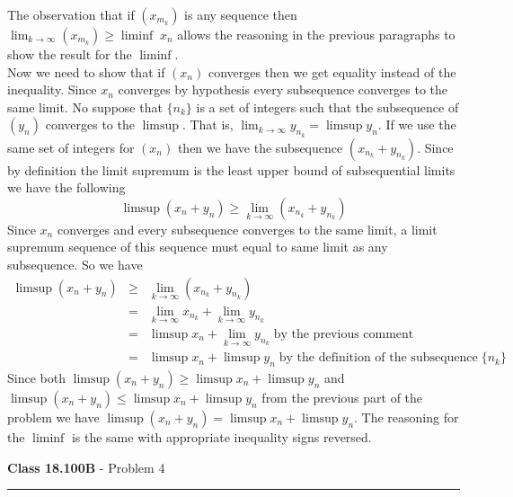 \documentclass[11pt,reqno]{article}
\begin{document}
The observation that if $(x_{m_k})$ is any sequence then $\lim_{k \to \infty}(x_{m_k}) \ge \liminf\; x_n$ allows the reasoning in the previous paragraphs to show the result for the $\liminf$.\\
\indent Now we need to show that if $(x_n)$ converges then we get equality instead of the inequality. Since $x_n$ converges by hypothesis every subsequence converges to the same limit. No suppose that $\{n_k\}$ is a set of integers such that the subsequence of $(y_n)$ converges to the $\limsup$. That is, $\lim_{k \to \infty}y_{n_k} = \limsup y_n$. If we use the same set of integers for $(x_n)$ then we have the subsequence $(x_{n_k} + y_{n_k} )$. Since by definition the limit supremum is the least upper bound of subsequential limits we have the following \[\limsup(x_n + y_n) \ge \lim_{k \to \infty}(x_{n_k} + y_{n_k})\]
Since $x_n$ converges and every subsequence converges to the same limit, a limit supremum sequence of this sequence must equal to same limit as any subsequence. So we have 
\begin{eqnarray*}
\limsup(x_n + y_n) & \ge & \lim_{k \to \infty}(x_{n_k} + y_{n_k})\\
                                  & = & \lim_{k \to \infty}x_{n_k} + \lim_{k \to \infty}y_{n_k}\\
                                  & = & \limsup x_n + \lim_{k \to \infty}y_{n_k} \; \text{by the previous comment}\\
                                 & = & \limsup x_n + \limsup y_n \;  \text{by the definition of the subsequence}\;\{n_k \}
\end{eqnarray*}
 Since both $\limsup(x_n + y_n) \ge \limsup x_n + \limsup y_n$ and $\limsup(x_n + y_n) \le \limsup x_n + \limsup y_n$ from the previous part of the problem we have  $\limsup(x_n + y_n) = \limsup x_n + \limsup y_n$. The reasoning for the $\liminf$ is the same with appropriate inequality signs reversed.

\vspace{15pt}
\begin{flushleft} 
\textbf{Class 18.100B} - Problem 4\\
\rule{500pt}{1pt}\\
\end{flushleft} 
\end{document}
